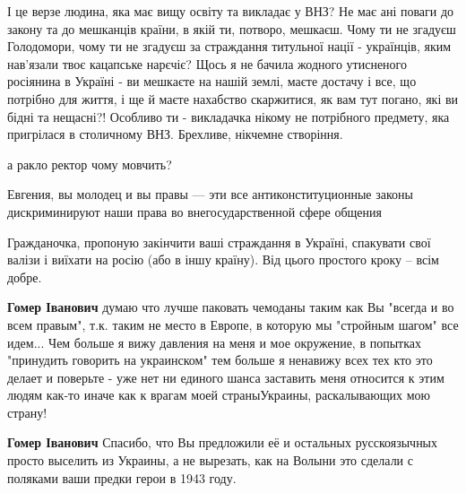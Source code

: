 \begin{itemize}
І це верзе людина, яка має вищу освіту та викладає у ВНЗ? Не має ані поваги до
закону та до мешканців країни, в якій ти, потворо, мешкаєш. Чому ти не згадуєш
Голодомори, чому ти не згадуєш за страждання титульної нації - українців, яким
нав'язали твоє кацапське нарєчіє? Щось я не бачила жодного утисненого росіянина
в Україні - ви мешкаєте на нашій землі, маєте достачу і все, що потрібно для
життя, і ще й маєте нахабство скаржитися, як вам тут погано, які ви бідні та
нещасні?! Особливо ти - викладачка нікому не потрібного предмету, яка пригрілася
в столичному ВНЗ. Брехливе, нікчемне створіння.


а ракло ректор чому мовчить?


Евгения, вы молодец и вы правы — эти все антиконституционные законы дискриминируют наши права во внегосударственной сфере общения


Гражданочка, пропоную закінчити ваші страждання в Україні, спакувати свої
валізи і виїхати на росію (або в іншу країну). Від цього простого кроку -- всім
добре.

\begin{itemize}

\textbf{Гомер Іванович} думаю что лучше паковать чемоданы таким как Вы "всегда и во всем правым", т.к. таким не место в Европе, в которую мы "стройным шагом" все идем... Чем больше я вижу давления на меня и мое окружение, в попытках "принудить говорить на украинском" тем больше я ненавижу всех тех кто это делает и поверьте - уже нет ни единого шанса заставить меня относится к этим людям как-то иначе как к врагам моей страныУкраины, раскалывающих мою страну!


\textbf{Гомер Іванович} Спасибо, что Вы предложили её и остальных русскоязычных просто выселить из Украины, а не вырезать, как на Волыни это сделали с поляками ваши предки герои в 1943 году.


\end{itemize}
\end{itemize}
